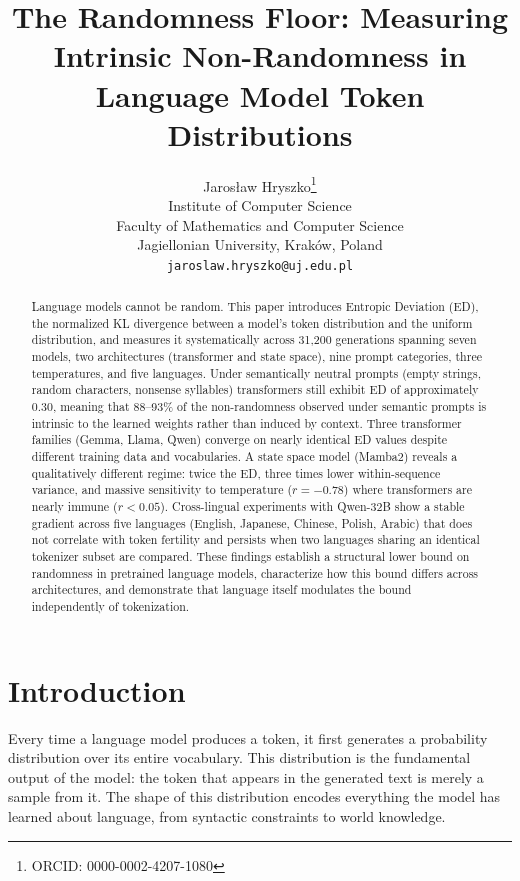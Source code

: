 \documentclass{article}
\title{The Randomness Floor: Measuring Intrinsic Non-Randomness in Language Model Token Distributions}
\author{Jaros{\l}aw Hryszko\thanks{ORCID: 0000-0002-4207-1080} \\
Institute of Computer Science\\
Faculty of Mathematics and Computer Science\\
Jagiellonian University, Krak{\'o}w, Poland\\
\texttt{jaroslaw.hryszko@uj.edu.pl}
}
\begin{document}
\maketitle

\begin{abstract}
Language models cannot be random. This paper introduces Entropic Deviation (ED), the normalized KL divergence between a model's token distribution and the uniform distribution, and measures it systematically across 31,200 generations spanning seven models, two architectures (transformer and state space), nine prompt categories, three temperatures, and five languages. Under semantically neutral prompts (empty strings, random characters, nonsense syllables) transformers still exhibit ED of approximately 0.30, meaning that 88--93\% of the non-randomness observed under semantic prompts is intrinsic to the learned weights rather than induced by context. Three transformer families (Gemma, Llama, Qwen) converge on nearly identical ED values despite different training data and vocabularies. A state space model (Mamba2) reveals a qualitatively different regime: twice the ED, three times lower within-sequence variance, and massive sensitivity to temperature ($r = -0.78$) where transformers are nearly immune ($r < 0.05$). Cross-lingual experiments with Qwen-32B show a stable gradient across five languages (English, Japanese, Chinese, Polish, Arabic) that does not correlate with token fertility and persists when two languages sharing an identical tokenizer subset are compared. These findings establish a structural lower bound on randomness in pretrained language models, characterize how this bound differs across architectures, and demonstrate that language itself modulates the bound independently of tokenization.
\end{abstract}

\section{Introduction}
\label{sec:intro}

Every time a language model produces a token, it first generates a probability distribution over its entire vocabulary. This distribution is the fundamental output of the model: the token that appears in the generated text is merely a sample from it. The shape of this distribution encodes everything the model has learned about language, from syntactic constraints to world knowledge.
\end{document}
